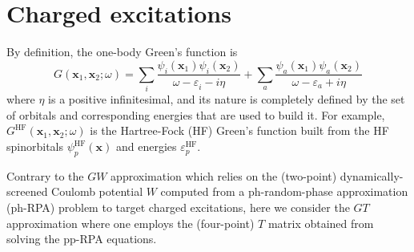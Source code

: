 \documentclass[aip,jcp,reprint,noshowkeys,superscriptaddress]{revtex4-1}
\newcommand{\bx}{\mathbf{x}}
\newcommand{\HF}{\text{HF}}
\newcommand{\e}[2]{\eps_{#1}^{#2}}
\newcommand{\SO}[1]{\psi_{#1}}
\newcommand{\eps}{\varepsilon}
\begin{document}
\section{Charged excitations}
\label{sec:charged}
By definition, the one-body Green's function is \cite{Martin_2016}
\begin{equation}
\label{eq:G}
	G(\bx_1,\bx_2;\omega) 
	= \sum_i \frac{\SO{i}(\bx_1) \SO{i}(\bx_2)}{\omega - \e{i}{} - i\eta}	
	+ \sum_a \frac{\SO{a}(\bx_1) \SO{a}(\bx_2)}{\omega - \e{a}{} + i\eta}	
\end{equation}
where $\eta$ is a positive infinitesimal, and its nature is completely defined by the set of orbitals and corresponding energies that are used to build it.
For example, $G^{\HF}(\bx_1,\bx_2;\omega)$ is the Hartree-Fock (HF) Green's function built from the HF spinorbitals $\SO{p}^{\HF}(\bx)$ and energies $\e{p}{\HF}$.

Contrary to the $GW$ approximation which relies on the (two-point) dynamically-screened Coulomb potential $W$ computed from a ph-random-phase approximation (ph-RPA) problem to target charged excitations, \cite{Hedin_1965,Aryasetiawan_1998,Onida_2002,Martin_2016,Reining_2017,Golze_2019} here we consider the $GT$ approximation where one employs the (four-point) $T$ matrix obtained from solving the pp-RPA equations.
\end{document}
